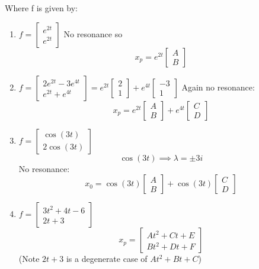 \documentclass[12pt]{article}
\begin{document}
Where f is given by:
\begin{enumerate}
    \item $f = \begin{bmatrix}
        e^{2t}\\
        e^{2t}
    \end{bmatrix}$
    No resonance so 
    \[\boxed{x_p = e^{2t} \begin{bmatrix}
        A\\B
    \end{bmatrix}}\]

    \item $f = \begin{bmatrix}
        2e^{2t} - 3e^{4t}\\
        e^{2t} + e^{4t}
    \end{bmatrix} = e^{2t} \begin{bmatrix}
        2\\1
    \end{bmatrix} + e^{4t} \begin{bmatrix}
        -3\\1
    \end{bmatrix}$
    Again no resonance:
    \[\boxed{x_p = e^{2t} \begin{bmatrix}
        A\\B
    \end{bmatrix} + e^{4t} \begin{bmatrix}
        C\\D
    \end{bmatrix}}\]

    \item $f= \begin{bmatrix}
        \cos(3t)\\
        2\cos(3t)
    \end{bmatrix}$
    \[\cos(3t) \implies \lambda = \pm 3i\]
    No resonance:
    \[\boxed{x_0 = \cos(3t) \begin{bmatrix}
        A\\B
    \end{bmatrix}+ \cos(3t) \begin{bmatrix}
        C\\D
    \end{bmatrix}}\]

    \item $f = \begin{bmatrix}
        3t^2 + 4t - 6\\
        2t + 3
    \end{bmatrix}$
    \[\boxed{x_p = \begin{bmatrix}
        At^2 + Ct + E\\
        Bt^2 + Dt + F
    \end{bmatrix}}\]
    (Note $2t + 3$ is a degenerate case of $At^2 + Bt +C$)


\end{enumerate}
\end{document}
